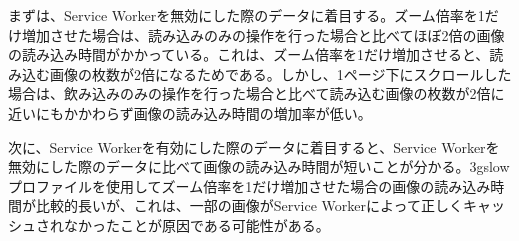 まずは、Service Workerを無効にした際のデータに着目する。ズーム倍率を1だけ増加させた場合は、読み込みのみの操作を行った場合と比べてほぼ2倍の画像の読み込み時間がかかっている。これは、ズーム倍率を1だけ増加させると、読み込む画像の枚数が2倍になるためである。しかし、1ページ下にスクロールした場合は、飲み込みのみの操作を行った場合と比べて読み込む画像の枚数が2倍に近いにもかかわらず画像の読み込み時間の増加率が低い。

次に、Service Workerを有効にした際のデータに着目すると、Service Workerを無効にした際のデータに比べて画像の読み込み時間が短いことが分かる。3gslowプロファイルを使用してズーム倍率を1だけ増加させた場合の画像の読み込み時間が比較的長いが、これは、一部の画像がService Workerによって正しくキャッシュされなかったことが原因である可能性がある。